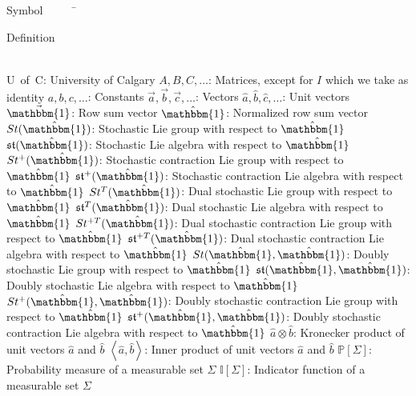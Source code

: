 \begin{tabbing}
	Symbol~~~~~\= \ \ \ \ \ \ \ \ \ \ \ \ \ \ \ \ \ \ \ \ \ \ \ \ \ \ \ \ \ \ \ \ \ \ \ \  \parbox{5in}{Definition}\\
	\addsymbol \mbox{U of C}: {University of Calgary}
	\addsymbol \mbox{$A,B,C,\dots$}: {Matrices, except for $I$ which we take as identity}
	\addsymbol \mbox{$a,b,c,\dots$}: {Constants}
	\addsymbol \mbox{$\vec{a},\vec{b},\vec{c},\dots$}: {Vectors}
	\addsymbol \mbox{$\hat{a},\hat{b},\hat{c},\dots$}: {Unit vectors}
	\addsymbol \mbox{$\vec{\mathbbm{1}}$}: {Row sum vector}
	\addsymbol \mbox{$\hat{\mathbbm{1}}$}: {Normalized row sum vector}
	\addsymbol \mbox{$St(\hat{\mathbbm{1}})$}: {Stochastic Lie group with respect to $\hat{\mathbbm{1}}$}
	\addsymbol \mbox{$\mathfrak{st}(\hat{\mathbbm{1}})$}: {Stochastic Lie algebra with respect to $\hat{\mathbbm{1}}$}
	\addsymbol \mbox{$St^{+}(\hat{\mathbbm{1}})$}: {Stochastic contraction Lie group with respect to $\hat{\mathbbm{1}}$}
	\addsymbol \mbox{$\mathfrak{st}^{+}(\hat{\mathbbm{1}})$}: {Stochastic contraction Lie algebra with respect to $\hat{\mathbbm{1}}$}
	\addsymbol \mbox{$St^T(\hat{\mathbbm{1}})$}: {Dual stochastic Lie group with respect to $\hat{\mathbbm{1}}$}
	\addsymbol \mbox{$\mathfrak{st}^T(\hat{\mathbbm{1}})$}: {Dual stochastic Lie algebra with respect to $\hat{\mathbbm{1}}$}
	\addsymbol \mbox{$St^{+T}(\hat{\mathbbm{1}})$}: {Dual stochastic contraction Lie group with respect to $\hat{\mathbbm{1}}$}
	\addsymbol \mbox{$\mathfrak{st}^{+T}(\hat{\mathbbm{1}})$}: {Dual stochastic contraction Lie algebra with respect to $\hat{\mathbbm{1}}$}
	\addsymbol \mbox{$St(\hat{\mathbbm{1}}, \hat{\mathbbm{1}})$}: {Doubly stochastic Lie group with respect to $\hat{\mathbbm{1}}$}
	\addsymbol \mbox{$\mathfrak{st}(\hat{\mathbbm{1}}, \hat{\mathbbm{1}})$}: {Doubly stochastic Lie algebra with respect to $\hat{\mathbbm{1}}$}
	\addsymbol \mbox{$St^{+}(\hat{\mathbbm{1}}, \hat{\mathbbm{1}})$}: {Doubly stochastic contraction Lie group with respect to $\hat{\mathbbm{1}}$}
	\addsymbol \mbox{$\mathfrak{st}^{+}(\hat{\mathbbm{1}}, \hat{\mathbbm{1}})$}: {Doubly stochastic contraction Lie algebra with respect to $\hat{\mathbbm{1}}$}
	\addsymbol \mbox{$\hat{a} \otimes \hat{b}$}: {Kronecker product of unit vectors $\hat{a}$ and $\hat{b}$}
	\addsymbol \mbox{$\left\langle \hat{a},\hat{b} \right\rangle$}: {Inner product of unit vectors $\hat{a}$ and $\hat{b}$}
	\addsymbol \mbox{$\mathbb{P}\left[\Sigma\right]$}: {Probability measure of a measurable set $\Sigma$}
	\addsymbol \mbox{$\mathbb{I}\left[\Sigma\right]$}: {Indicator function of a measurable set $\Sigma$}

\end{tabbing}
